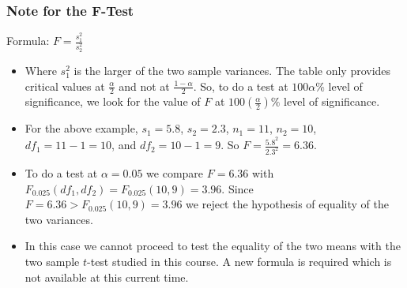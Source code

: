 \documentclass[12pt, letterpaper]{article}
\begin{document}
            \subsubsection{Note for the F-Test}
                \begin{mdframed}[leftmargin=0.5cm, rightmargin=0.5cm]
                    Formula: $F = \frac{s_1^2}{s_2^2}$
                    \begin{itemize}
                        \item Where $s_1^2$ is the larger of the two sample variances. The table only provides critical values at $\frac{\alpha}{2}$ and not at $\frac{1-\alpha}{2}$. So, to do a test at $100\alpha\%$ level of significance, we look for the value of $F$ at $100(\frac{\alpha}{2})\%$ level of significance.
                        \item For the above example, $s_1 = 5.8$, $s_2 = 2.3$, $n_1 = 11$, $n_2 = 10$, $df_1 = 11 - 1 = 10$, and $df_2 = 10 - 1 = 9$. So $F = \frac{5.8^2}{2.3^2} = 6.36$.
                        \item To do a test at $\alpha = 0.05$ we compare $F = 6.36$ with $F_{0.025}(df_1,df_2) = F_{0.025}(10,9) = 3.96$. Since $F = 6.36 > F_{0.025}(10,9) = 3.96$ we reject the hypothesis of equality of the two variances.
                        \item In this case we cannot proceed to test the equality of the two means with the two sample $t$-test studied in this course. A new formula is required which is not available at this current time.
                    \end{itemize}                    
                \end{mdframed}
                \newpage
\end{document}

